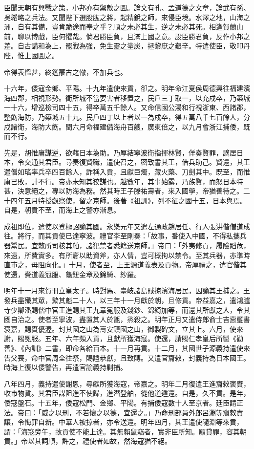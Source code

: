 \begin{pinyinscope}
臣聞天朝有興戰之策，小邦亦有禦敵之圖。論文有孔、孟道德之文章，論武有孫、吳韜略之兵法。又聞陛下選股肱之將，起精銳之師，來侵臣境。水澤之地，山海之洲，自有其備，豈肯跪途而奉之乎？順之未必其生，逆之未必其死。相逢賀蘭山前，聊以博戲，臣何懼哉。倘君勝臣負，且滿上國之意。設臣勝君負，反作小邦之差。自古講和為上，罷戰為強，免生靈之塗炭，拯黎庶之艱辛。特遣使臣，敬叩丹陛，惟上國圖之。

帝得表慍甚，終鑑蒙古之轍，不加兵也。

十六年，倭寇金鄉、平陽。十九年遣使來貢，卻之。明年命江夏侯周德興往福建濱海四郡，相視形勢。衛所城不當要害者移置之，民戶三丁取一，以充戍卒，乃築城一十六，增巡檢司四十五，得卒萬五千餘人。又命信國公湯和行視浙東、西諸郡，整飭海防，乃築城五十九。民戶四丁以上者以一為戍卒，得五萬八千七百餘人，分戍諸衛，海防大飭。閏六月命福建備海舟百艘，廣東倍之，以九月會浙江捕倭，既而不行。

先是，胡惟庸謀逆，欲藉日本為助。乃厚結寧波衛指揮林賢，佯奏賢罪，謫居日本，令交通其君臣。尋奏復賢職，遣使召之，密致書其王，借兵助己。賢還，其王遣僧如瑤率兵卒四百餘人，詐稱入貢，且獻巨燭，藏火藥、刀劍其中。既至，而惟庸已敗，計不行。帝亦未知其狡謀也。越數年，其事始露，乃族賢，而怒日本特甚，決意絕之，專以防海為務。然其時王子滕祐壽者，來入國學，帝猶善待之。二十四年五月特授觀察使，留之京師。後著《祖訓》，列不征之國十五，日本與焉。自是，朝貢不至，而海上之警亦漸息。

成祖即位，遣使以登極詔諭其國。永樂元年又遣左通政趙居任、行人張洪偕僧道成往。將行，而其貢使已達寧波。禮官李至剛奏：「故事，番使入中國，不得私攜兵器鬻民。宜敕所司核其舶，諸犯禁者悉籍送京師。」帝曰：「外夷修貢，履險蹈危，來遠，所費實多。有所齎以助資斧，亦人情，豈可概拘以禁令。至其兵器，亦準時直市之，毋阻向化。」十月，使者至，上王源道義表及貢物。帝厚禮之，遣官偕其使還，賚道義冠服、龜鈕金章及錦綺、紗羅。

明年十一月來賀冊立皇太子。時對馬、臺岐諸島賊掠濱海居民，因諭其王捕之。王發兵盡殲其眾，縶其魁二十人，以三年十一月獻於朝，且修貢。帝益嘉之，遣鴻臚寺少卿潘賜偕中官王進賜其王九章冕服及錢鈔、錦綺加等，而還其所獻之人，令其國自治之。使者至寧波，盡置其人於甑，烝殺之。明年正月又遣侍郎俞士吉齎璽書褒嘉，賜賚優渥。封其國之山為壽安鎮國之山，御製碑文，立其上。六月，使來謝，賜冕服。五年、六年頻入貢，且獻所獲海寇。使還，請賜仁孝皇后所製《勸善》、《內訓》二書，即命各給百本。十一月再貢。十二月，其國世子源義持遣使來告父喪，命中官周全往祭，賜謚恭獻，且致賻。又遣官齎敕，封義持為日本國王。時海上復以倭警告，再遣官諭義持剿捕。

八年四月，義持遣使謝恩，尋獻所獲海寇，帝嘉之。明年二月復遣王進齎敕褒賚，收市物貨。其君臣謀阻進不使歸，進潛登舶，從他道遁還。自是，久不貢。是年，倭寇盤石。十五年，倭寇松門、金鄉、平陽。有捕倭寇數十人至京者。廷臣請正法。帝曰：「威之以刑，不若懷之以德，宜還之。」乃命刑部員外郎呂淵等齎敕責讓，令悔罪自新。中華人被掠者，亦令送還。明年四月，其王遣使隨淵等來貢，謂：「海寇旁午，故貢使不能上達。其無賴鼠竊者，實非臣所知。願貸罪，容其朝貢。」帝以其詞順，許之，禮使者如故，然海寇猶不絕。


\end{pinyinscope}

